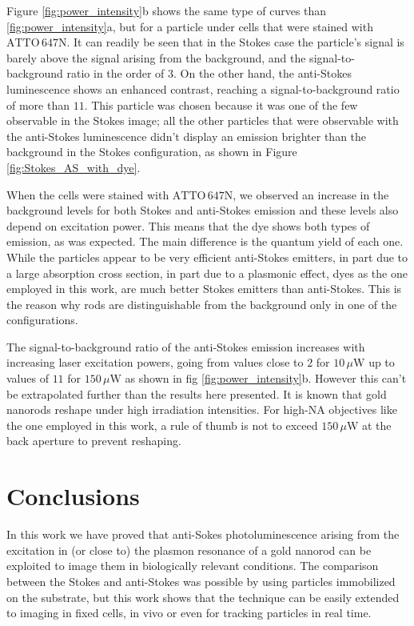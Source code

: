 \documentclass[journal=nalefd,manuscript=letter]{achemso}
\newcommand{\uW}{\ensuremath{\,\mu\textrm{W}}}
\newcommand{\atto}{\ensuremath{\textrm{ATTO}\,647\textrm{N}}}
\begin{document}
Figure \ref{fig:power_intensity}b shows the same type of curves than
\ref{fig:power_intensity}a, but for a particle under cells that were stained
with \atto. It can readily be seen that in the Stokes case the particle's signal
is barely above the signal arising from the background, and the
signal-to-background ratio in the order of $3$. On the other hand, the
anti-Stokes luminescence shows an enhanced contrast, reaching a
signal-to-background ratio of more than $11$. This particle was chosen because
it was one of the few observable in the Stokes image; all the other particles
that were observable with the anti-Stokes luminescence didn't display an
emission brighter than the background in the Stokes configuration, as shown in
Figure \ref{fig:Stokes_AS_with_dye}.

When the cells were stained with \atto, we observed an increase in the
background levels for both Stokes and anti-Stokes emission and these levels also
depend on excitation power. This means that the dye shows both types of
emission, as was expected. The main difference is the quantum yield of each one.
While the particles appear to be very efficient anti-Stokes emitters, in part
due to a large absorption cross section, in part due to a plasmonic effect, dyes as the one
employed in this work, are much better Stokes emitters than anti-Stokes. This is
the reason why rods are distinguishable from the background only in one of the
configurations.

The signal-to-background ratio of the anti-Stokes emission increases with
increasing laser excitation powers, going from values close to $2$ for $10\uW$
up to values of $11$ for $150\uW$ as shown in fig \ref{fig:power_intensity}b.
However this can't be extrapolated further than the results here presented. It
is known that gold nanorods reshape under high irradiation intensities. For
high-NA objectives like the one employed in this work, a rule of thumb is not to
exceed $150\uW$ at the back aperture to prevent reshaping.

\section{Conclusions}
In this work we have proved that anti-Sokes photoluminescence arising from the
excitation in (or close to) the plasmon resonance of a gold nanorod can be exploited to
image them in biologically relevant conditions. The comparison between the
Stokes and anti-Stokes was possible by using particles immobilized on the
substrate, but this work shows that the technique can be easily extended to
imaging in fixed cells, in vivo or even for tracking particles in real time.
\end{document}
